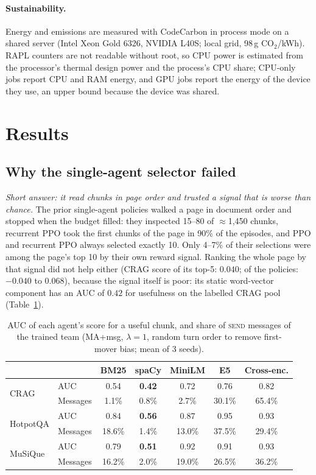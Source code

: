 \documentclass[sigconf,anonymous]{aamas}
\theoremstyle{plain}
\theoremstyle{definition}
\begin{document}
\paragraph{Sustainability.}
Energy and emissions are measured with CodeCarbon in process mode on a shared server (Intel Xeon Gold 6326, NVIDIA L40S; local grid, 98\,g CO$_2$/kWh). RAPL counters are not readable without root, so CPU power is estimated from the processor's thermal design power and the process's CPU share; CPU-only jobs report CPU and RAM energy, and GPU jobs report the energy of the device they use, an upper bound because the device was shared.

\section{Results}

\subsection{Why the single-agent selector failed}\label{sec:diagnosis}

\emph{Short answer: it read chunks in page order and trusted a signal that is worse than chance.} The prior single-agent policies walked a page in document order and stopped when the budget filled: they inspected 15--80 of $\approx$1{,}450 chunks, recurrent PPO took the first chunks of the page in 90\% of the episodes, and PPO and recurrent PPO always selected exactly 10. Only 4--7\% of their selections were among the page's top 10 by their own reward signal. Ranking the whole page by that signal did not help either (CRAG score of its top-5: $0.040$; of the policies: $-0.040$ to $0.068$), because the signal itself is poor: its static word-vector component has an AUC of $0.42$ for usefulness on the labelled CRAG pool (Table~\ref{tab:signals}).

\begin{table}[t]
\centering\small
\caption{AUC of each agent's score for a useful chunk, and share of \textsc{send} messages of the trained team (MA+msg, $\lambda=1$, random turn order to remove first-mover bias; mean of 3 seeds).}
\label{tab:signals}
\setlength{\tabcolsep}{3.5pt}
\begin{tabular}{ll ccccc}
\toprule
 & & BM25 & spaCy & MiniLM & E5 & Cross-enc. \\
\midrule
\multirow{2}{*}{CRAG} & AUC & 0.54 & \textbf{0.42} & 0.72 & 0.76 & 0.82 \\
 & Messages & 1.1\% & 0.8\% & 2.7\% & 30.1\% & 65.4\% \\
\midrule
\multirow{2}{*}{HotpotQA} & AUC & 0.84 & \textbf{0.56} & 0.87 & 0.95 & 0.93 \\
 & Messages & 18.6\% & 1.4\% & 13.0\% & 37.5\% & 29.4\% \\
\midrule
\multirow{2}{*}{MuSiQue} & AUC & 0.79 & \textbf{0.51} & 0.92 & 0.91 & 0.93 \\
 & Messages & 16.2\% & 2.0\% & 19.0\% & 26.5\% & 36.2\% \\
\bottomrule
\end{tabular}
\end{table}
\end{document}
